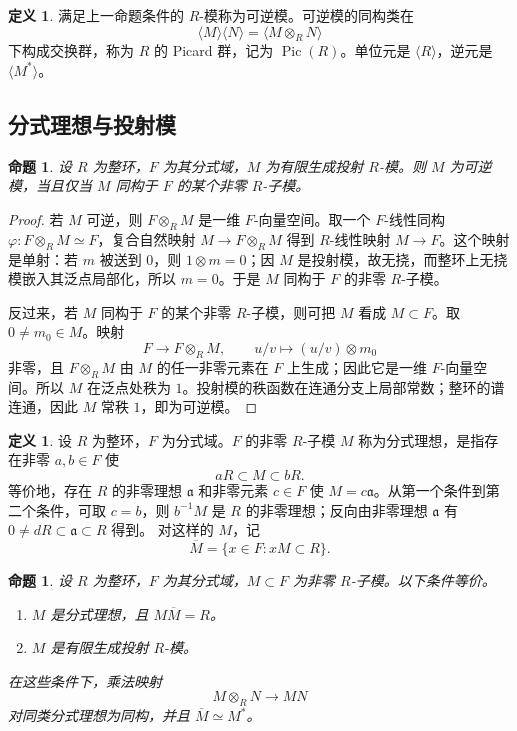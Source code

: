 \documentclass[11pt,a4paper,openany]{ctexbook}
\numberwithin{equation}{chapter}
\newcommand{\Pic}{\operatorname{Pic}}
\theoremstyle{plain}
\newtheorem{proposition}[theorem]{命题}
\theoremstyle{definition}
\newtheorem{definition}[theorem]{定义}
\theoremstyle{remark}
\begin{document}
\begin{definition}
满足上一命题条件的 $R$-模称为可逆模。可逆模的同构类在
\[
\langle M\rangle\langle N\rangle=\langle M\otimes_RN\rangle
\]
下构成交换群，称为 $R$ 的 Picard 群，记为 $\Pic(R)$。单位元是 $\langle R\rangle$，逆元是 $\langle M^*\rangle$。
\end{definition}

\subsection{分式理想与投射模}

\begin{proposition}
设 $R$ 为整环，$F$ 为其分式域，$M$ 为有限生成投射 $R$-模。则 $M$ 为可逆模，当且仅当 $M$ 同构于 $F$ 的某个非零 $R$-子模。
\end{proposition}

\begin{proof}
若 $M$ 可逆，则 $F\otimes_RM$ 是一维 $F$-向量空间。取一个
$F$-线性同构 $\varphi:F\otimes_RM\simeq F$，复合自然映射
$M\to F\otimes_RM$ 得到 $R$-线性映射 $M\to F$。这个映射是单射：若
$m$ 被送到 $0$，则 $1\otimes m=0$；因 $M$ 是投射模，故无挠，而整环上无挠模嵌入其泛点局部化，所以 $m=0$。于是 $M$ 同构于
$F$ 的非零 $R$-子模。

反过来，若 $M$ 同构于 $F$ 的某个非零 $R$-子模，则可把 $M$ 看成
$M\subset F$。取 $0\ne m_0\in M$。映射
\[
F\longrightarrow F\otimes_RM,\qquad u/v\longmapsto (u/v)\otimes m_0
\]
非零，且 $F\otimes_RM$ 由 $M$ 的任一非零元素在 $F$ 上生成；因此它是一维
$F$-向量空间。所以 $M$ 在泛点处秩为 $1$。投射模的秩函数在连通分支上局部常数；整环的谱连通，因此 $M$ 常秩 $1$，即为可逆模。
\end{proof}

\begin{definition}
设 $R$ 为整环，$F$ 为分式域。$F$ 的非零 $R$-子模 $M$ 称为分式理想，是指存在非零 $a,b\in F$ 使
\[
aR\subset M\subset bR.
\]
等价地，存在 $R$ 的非零理想 $\mathfrak a$ 和非零元素 $c\in F$ 使
$M=c\mathfrak a$。从第一个条件到第二个条件，可取 $c=b$，则
$b^{-1}M$ 是 $R$ 的非零理想；反向由非零理想 $\mathfrak a$ 有
$0\ne dR\subset\mathfrak a\subset R$ 得到。
对这样的 $M$，记
\[
\overline M=\{x\in F:xM\subset R\}.
\]
\end{definition}

\begin{proposition}
设 $R$ 为整环，$F$ 为其分式域，$M\subset F$ 为非零 $R$-子模。以下条件等价。
\begin{enumerate}[label=(\arabic*)]
\item $M$ 是分式理想，且 $M\overline M=R$。
\item $M$ 是有限生成投射 $R$-模。
\end{enumerate}
在这些条件下，乘法映射
\[
M\otimes_RN\longrightarrow MN
\]
对同类分式理想为同构，并且 $\overline M\simeq M^*$。
\end{proposition}
\end{document}
